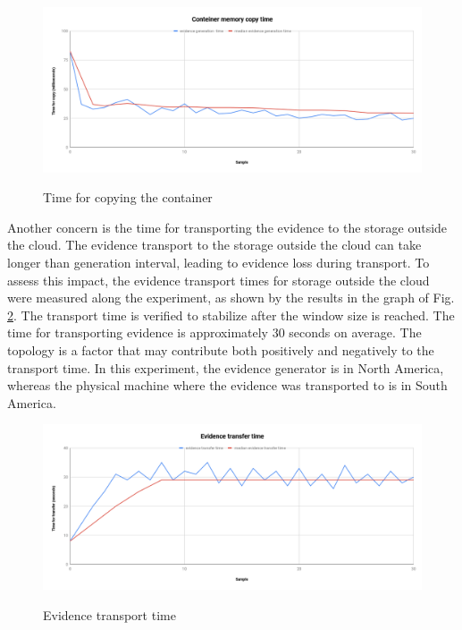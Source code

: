 \documentclass[conference]{IEEEtran}
\begin{document}
\begin{figure}[htb!]
\footnotesize
\caption{Time for copying the container}
\includegraphics[scale=0.40]{memoria_copia_ieee.png}
\centering
\label{fig:memoria_copia}
\end{figure}


Another concern is the time for transporting the evidence to the storage outside the cloud.
%
The evidence transport to the storage outside the cloud can take longer than generation interval, leading to evidence loss during transport. 
%
To assess this impact, the evidence transport times for storage outside the cloud were measured along the experiment, as shown by the results in the graph of Fig. \ref{fig:evidencia_transporte}.
%
The transport time is verified to stabilize after the window size is reached. 
%
The time for transporting evidence is approximately 30 seconds on average. 
%
The topology is a factor that may contribute both positively and negatively to the transport time. 
%
In this experiment, the evidence generator is in North America, whereas the physical machine where the evidence was transported to is in South America.

\begin{figure}[htb!]
\footnotesize
\caption{Evidence transport time}
\includegraphics[scale=0.40]{evidencia_download_ieee.png}
\centering
\label{fig:evidencia_transporte}
\end{figure}
\end{document}
